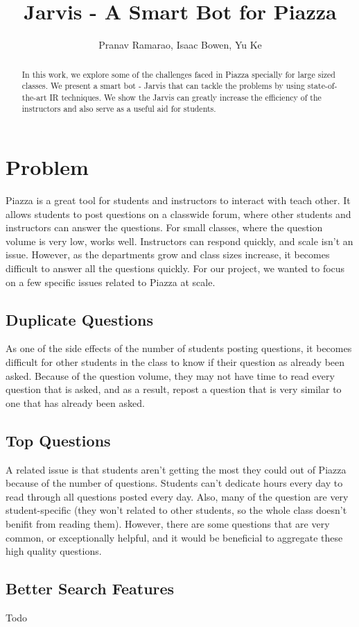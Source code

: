 \documentclass[sigconf]{acmart}
\begin{document}
\title{Jarvis - A Smart Bot for Piazza}
\author{Pranav Ramarao, Isaac Bowen, Yu Ke}


\renewcommand{\shortauthors}{B. Trovato et al.}


\begin{abstract}
In this work, we explore some of the challenges faced in Piazza specially for large sized classes. We present a smart bot - Jarvis that can tackle the problems by using state-of-the-art IR techniques. We show the Jarvis can greatly increase the efficiency of the instructors and also serve as a useful aid for students.
\end{abstract}


\maketitle

\section{Problem}
Piazza is a great tool for students and instructors to interact with teach other. It allows students to post questions on a classwide forum, where other students and instructors can answer the questions. For small classes, where the question volume is very low, works well. Instructors can respond quickly, and scale isn't an issue. However, as the departments grow and class sizes increase, it becomes difficult to answer all the questions quickly. For our project, we wanted to focus on a few specific issues related to Piazza at scale.
\subsection{Duplicate Questions}
As one of the side effects of the number of students posting questions, it becomes difficult for other students in the class to know if their question as already been asked. Because of the question volume, they may not have time to read every question that is asked, and as a result, repost a question that is very similar to one that has already been asked.

\subsection{Top Questions}
A related issue is that students aren't getting the most they could out of Piazza because of the number of questions. Students can't dedicate hours every day to read through all questions posted every day. Also, many of the question are very student-specific (they won't related to other students, so the whole class doesn't benifit from reading them). However, there are some questions that are very common, or exceptionally helpful, and it would be beneficial to aggregate these high quality questions.

\subsection{Better Search Features}
Todo



 
\end{document}
